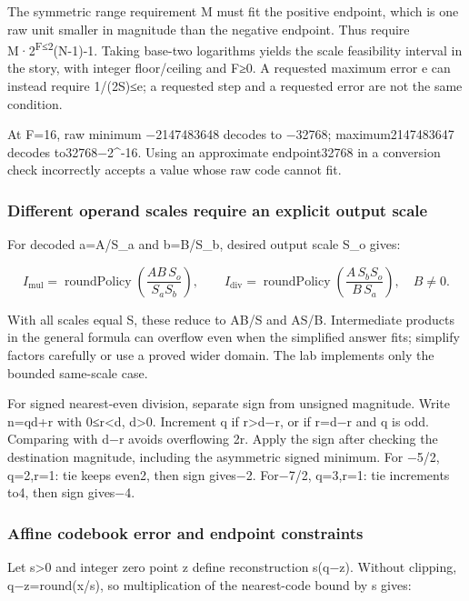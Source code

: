 The symmetric range requirement M must fit the positive endpoint, which is one raw unit smaller in magnitude than the negative endpoint. Thus require M·2\textsuperscript{F≤2}(N-1)-1. Taking base-two logarithms yields the scale feasibility interval in the story, with integer floor/ceiling and F≥0. A requested maximum error e can instead require 1/(2S)≤e; a requested step and a requested error are not the same condition.

At F=16, raw minimum −2147483648 decodes to −32768; maximum2147483647 decodes to32768−2\^{}-16. Using an approximate endpoint32768 in a conversion check incorrectly accepts a value whose raw code cannot fit.

\subsubsection{Different operand scales require an explicit output scale}\label{different-operand-scales-require-an-explicit-output-scale}

For decoded a=A/S\_a and b=B/S\_b, desired output scale S\_o gives:

\[
I_{\mathrm{mul}}=\operatorname{roundPolicy}
  \left(\frac{AB\,S_o}{S_aS_b}\right),
\qquad
I_{\mathrm{div}}=\operatorname{roundPolicy}
  \left(\frac{A\,S_bS_o}{B\,S_a}\right),\quad B\ne0.
\]

With all scales equal S, these reduce to AB/S and AS/B. Intermediate products in the general formula can overflow even when the simplified answer fits; simplify factors carefully or use a proved wider domain. The lab implements only the bounded same-scale case.

For signed nearest-even division, separate sign from unsigned magnitude. Write n=qd+r with 0≤r\textless d, d\textgreater0. Increment q if r\textgreater d−r, or if r=d−r and q is odd. Comparing with d−r avoids overflowing 2r. Apply the sign after checking the destination magnitude, including the asymmetric signed minimum. For −5/2, q=2,r=1: tie keeps even2, then sign gives−2. For−7/2, q=3,r=1: tie increments to4, then sign gives−4.

\subsubsection{Affine codebook error and endpoint constraints}\label{affine-codebook-error-and-endpoint-constraints}

Let s\textgreater0 and integer zero point z define reconstruction s(q−z). Without clipping, q−z=round(x/s), so multiplication of the nearest-code bound by s gives:

